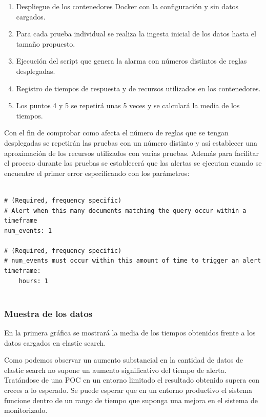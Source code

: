 \begin{enumerate}
	\item Despliegue de los contenedores Docker con la configuración y sin datos cargados.
	\item Para cada prueba individual se realiza la ingesta inicial de los datos   hasta el tamaño propuesto.
	\item Ejecución del script que genera la alarma con números distintos de reglas desplegadas.
	\item Registro de tiempos de respuesta y de recursos utilizados en los contenedores.
	\item Los puntos 4 y 5 se repetirá unas 5 veces y se calculará la media de los tiempos.
\end{enumerate}


Con el fin de comprobar como afecta el número de reglas que se tengan desplegadas se repetirán las pruebas con un número distinto y así establecer una aproximación de los recursos utilizados con varias pruebas. Además para facilitar el proceso durante las pruebas se establecerá que las alertas se ejecutan cuando se encuentre el primer error especificando con los parámetros:

\begin{verbatim}

# (Required, frequency specific)
# Alert when this many documents matching the query occur within a timeframe
num_events: 1

# (Required, frequency specific)
# num_events must occur within this amount of time to trigger an alert
timeframe:
    hours: 1
    
\end{verbatim}


\subsubsection{Muestra de los datos}

En la primera gráfica se mostrará la media de los tiempos obtenidos frente a los datos cargados en elastic search.

Como podemos observar un aumento substancial en la cantidad de datos de elastic search no supone un aumento significativo del tiempo de alerta. Tratándose de una POC en un entorno limitado el resultado obtenido supera con creces a lo esperado. Se puede esperar que en un entorno productivo el sistema funcione dentro de un rango de tiempo que suponga una mejora en el sistema de monitorizado. 

